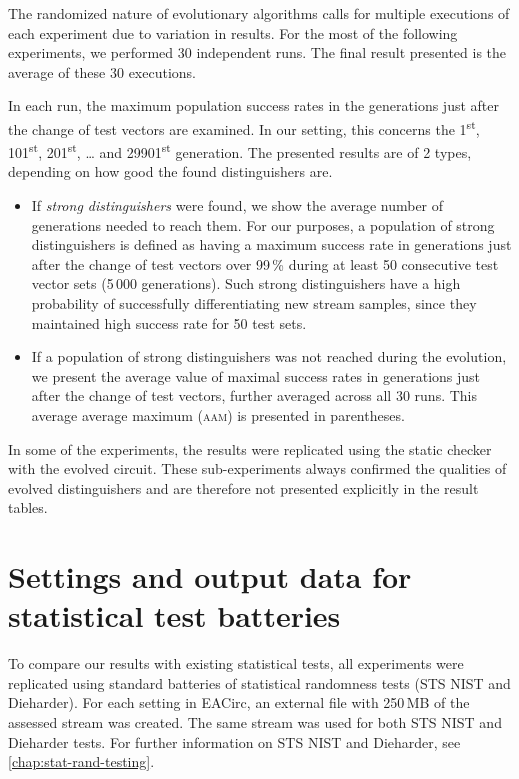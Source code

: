 \documentclass[12pt,twoside]{fithesis2}		%
\renewcommand{\_}{\leavevmode \kern0.0em\vbox{\hrule width0.4em}}
\newcommand{\squarebullet}{\textcolor{black}{\raisebox{0.15em}{\rule{4pt}{4pt}}}}
\newenvironment{myItemize}{
  \begin{itemize}[leftmargin=2em,rightmargin=1em,itemsep=\parskip ,parsep=0em,topsep=0em,partopsep=0em]
  \renewcommand{\labelitemi}{\squarebullet}
  \renewcommand{\labelitemii}{$\diamond$}
}{
  \end{itemize}
}
\begin{document}
The randomized nature of evolutionary algorithms calls for multiple executions of each experiment due to variation in results.
For the most of the following experiments, we performed 30 independent runs. The final result presented is the average
of these 30 executions.

In each run, the maximum population success rates in the generations just after the change of test vectors are examined.
In our setting, this concerns the 1\textsuperscript{st}, 101\textsuperscript{st}, 201\textsuperscript{st}, \dots{} 
and 29901\textsuperscript{st} generation.
The presented results are of 2 types, depending on how good the found distinguishers are.
\begin{myItemize}
\item If \textit{strong distinguishers} were found, we show the average number of generations needed
to reach them. For our purposes, a population of strong distinguishers is defined as having a maximum success rate in generations just
after the change of test vectors over 99\,\% during at least 50 consecutive test vector sets (5\,000 generations).
Such strong distinguishers have a high probability of successfully differentiating new stream samples, since they maintained high
success rate for 50 test sets.
\item If a population of strong distinguishers was not reached during the evolution, 
we present the average value of maximal success rates in generations just after the change of test vectors,
further averaged across all 30 runs. This average average maximum (\textsc{aam}) is presented in parentheses.
\end{myItemize}

\noindent
In some of the experiments, the results were replicated using the static checker with the evolved circuit.
These sub-experiments always confirmed the qualities of evolved distinguishers and are therefore not presented explicitly
in the result tables.

\section{Settings and output data for statistical test batteries}
\label{sec:settings-statistics}

To compare our results with existing statistical tests, all experiments were replicated using standard batteries of statistical
randomness tests (STS NIST and Dieharder). 
For each setting in EACirc, an external file with 250\,MB of the assessed stream was created.
The same stream was used for both STS NIST and Dieharder tests. For further information on STS NIST and Dieharder, 
see \autoref{chap:stat-rand-testing}.
\end{document}

